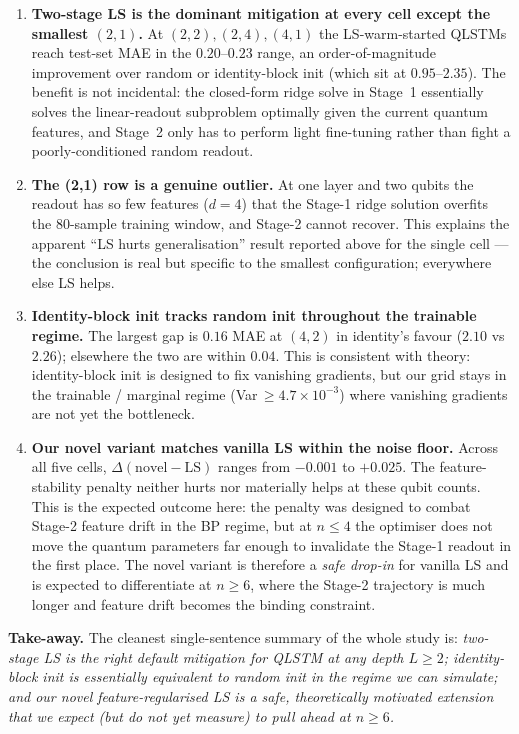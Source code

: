 \documentclass[11pt,a4paper]{article}
\begin{document}
\begin{enumerate}
  \item \textbf{Two-stage LS is the dominant mitigation at every cell except the smallest $(2,1)$.} At $(2,2), (2,4), (4,1)$ the LS-warm-started QLSTMs reach test-set MAE in the $0.20$--$0.23$ range, an order-of-magnitude improvement over random or identity-block init (which sit at $0.95$--$2.35$). The benefit is not incidental: the closed-form ridge solve in Stage~1 essentially solves the linear-readout subproblem optimally given the current quantum features, and Stage~2 only has to perform light fine-tuning rather than fight a poorly-conditioned random readout.
  \item \textbf{The (2,1) row is a genuine outlier.} At one layer and two qubits the readout has so few features ($d{=}4$) that the Stage-1 ridge solution overfits the 80-sample training window, and Stage-2 cannot recover. This explains the apparent ``LS hurts generalisation'' result reported above for the single cell --- the conclusion is real but specific to the smallest configuration; everywhere else LS helps.
  \item \textbf{Identity-block init tracks random init throughout the trainable regime.} The largest gap is $0.16$ MAE at $(4,2)$ in identity's favour ($2.10$ vs $2.26$); elsewhere the two are within $0.04$. This is consistent with theory: identity-block init is designed to fix vanishing gradients, but our grid stays in the trainable / marginal regime (Var$\,\ge 4.7\times 10^{-3}$) where vanishing gradients are not yet the bottleneck.
  \item \textbf{Our novel variant matches vanilla LS within the noise floor.} Across all five cells, $\Delta(\text{novel}-\text{LS})$ ranges from $-0.001$ to $+0.025$. The feature-stability penalty neither hurts nor materially helps at these qubit counts. This is the expected outcome here: the penalty was designed to combat Stage-2 feature drift in the BP regime, but at $n \le 4$ the optimiser does not move the quantum parameters far enough to invalidate the Stage-1 readout in the first place. The novel variant is therefore a \emph{safe drop-in} for vanilla LS and is expected to differentiate at $n \ge 6$, where the Stage-2 trajectory is much longer and feature drift becomes the binding constraint.
\end{enumerate}

\textbf{Take-away.} The cleanest single-sentence summary of the whole study is: \emph{two-stage LS is the right default mitigation for QLSTM at any depth $L \ge 2$; identity-block init is essentially equivalent to random init in the regime we can simulate; and our novel feature-regularised LS is a safe, theoretically motivated extension that we expect (but do not yet measure) to pull ahead at $n \ge 6$.}
\end{document}
